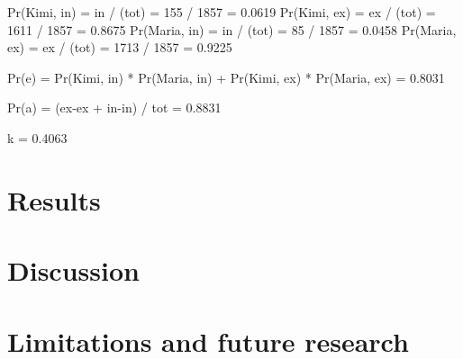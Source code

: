 \documentclass[preprint,authoryear,12pt]{elsarticle}
\begin{document}
Pr(Kimi, in) = in / (tot)  =  155 / 1857 = 0.0619
Pr(Kimi, ex) = ex / (tot)  = 1611 / 1857 = 0.8675
Pr(Maria, in) = in / (tot) =   85 / 1857 = 0.0458
Pr(Maria, ex) = ex / (tot) = 1713 / 1857 = 0.9225

Pr(e) = Pr(Kimi, in) * Pr(Maria, in) + Pr(Kimi, ex) * Pr(Maria, ex) = 0.8031

Pr(a) = (ex-ex + in-in) / tot = 0.8831

k = 0.4063

\section{Results}
\label{sec:results}


\section{Discussion}
\label{sec:discussion}


\section{Limitations and future research}
\label{sec:conclusion}






\end{document}
